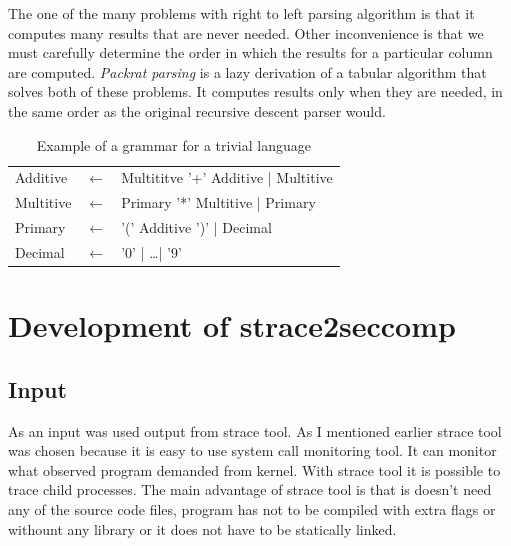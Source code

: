 The one of the many problems with right to left parsing algorithm is that it computes many results that are never needed.
Other inconvenience is that we must carefully determine the order in which the results for a particular column are computed.
\textit{Packrat parsing} is a lazy derivation of a tabular algorithm that solves both of these problems.
It computes results only when they are needed, in the same order as the original recursive descent parser would.
\cite{Ford:PEG}

\begin{table}[h]
	\begin{center}
  \begin{tabular}{lcl}
      Additive  & $\leftarrow$ & Multititve '+' Additive | Multitive \\
      Multitive & $\leftarrow$ & Primary '*' Multitive | Primary     \\
      Primary   & $\leftarrow$ & '(' Additive ')' | Decimal          \\
      Decimal   & $\leftarrow$ & '0' | \ldots | '9'
  \end{tabular}
  \end{center}
  \caption{Example of a grammar for a trivial language}
  \label{fig:pegtl:example}
\end{table}






\chapter{Development of strace2seccomp}

\section{Input}
As an input was used output from strace tool. As I mentioned earlier strace tool was
chosen because it is easy to use system call monitoring tool. It can monitor what observed
program demanded from kernel. With strace tool it is possible to trace child processes.
The main advantage of strace tool is that is doesn't need any of the source code files,
program has not to be compiled with extra flags or withount any library or
it does not have to be statically linked.

